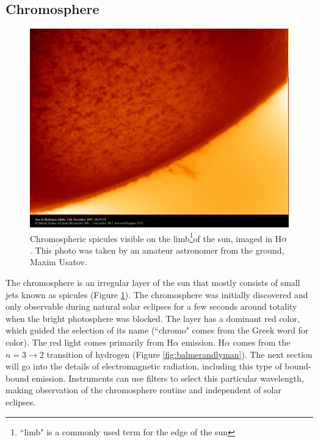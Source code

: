\subsection{Chromosphere}

\begin{figure}[!h]
    \begin{center}
	    \includegraphics[width=120mm]{Images/Spicules.png}
    \end{center}
    \caption[Spicules of the Chromosphere]{
        Chromospheric spicules visible on the limb\footnote{``limb" is a commonly used term for the edge
        of the sun}of the sun, imaged in H$\alpha$. This photo was taken by an amateur astronomer from the ground, 
        Maxim Usatov. 
    }
    \label{fig:spicules}
\end{figure}

The chromosphere is an irregular layer of the sun that mostly consists of small jets known as spicules (Figure \ref{fig:spicules}). The chromosphere was initially discovered and only observable during natural solar eclipses for a few seconds around totality when the bright photosphere was blocked. The layer has a dominant red color, which guided the selection of its name (``chromo" comes from the Greek word for color). The red light comes primarily from H$\alpha$ emission. H$\alpha$ comes from the $n = 3\rightarrow 2$ transition of hydrogen (Figure \ref{fig:balmerandlyman}). The next section will go into the details of electromagnetic radiation, including this type of bound-bound emission. Instruments can use filters to select this particular wavelength, making observation of the chromosphere routine and independent of solar eclipses. 

